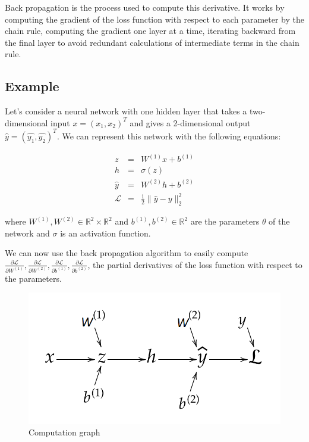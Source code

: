 \documentclass[10pt,a4paper]{article}
\theoremstyle{definition}
\theoremstyle{plain}
\begin{document}
Back propagation \cite{11} is the process used to compute this derivative. It works by computing the gradient of the loss function with respect to each parameter by the chain rule, computing the gradient one layer at a time, iterating backward from the final layer to avoid redundant calculations of intermediate terms in the chain rule.

\subsection{Example} \label{exnn}
Let's consider a neural network with one hidden layer that takes a two-dimensional input $x = (x_1, x_2)^T$ and gives a 2-dimensional output $\hat{y} = (\hat{y_1},\hat{y_2})^T$. We can represent this network with the following equations:

\begin{eqnarray*}
z & = & W^{(1)}x + b^{(1)} \\ 
h & = & \sigma (z)\\
\hat{y} & = &  W^{(2)}h + b^{(2)} \\
\mathcal{L} & = & \frac{1}{2} \| \hat{y} - y \|_2^2
\end{eqnarray*}
   
where $W^{(1)}, W^{(2)} \in \mathbb{R}^2\times \mathbb{R}^2$ and $b^{(1)}, b^{(2)} \in \mathbb{R}^2$ are the parameters $\theta$ of the network and $\sigma$ is an activation function.

We can now use the back propagation algorithm to easily compute $\frac{\partial \mathcal{L}}{\partial W^{(1)}}, \frac{\partial \mathcal{L}}{\partial W^{(2)}},\frac{\partial \mathcal{L}}{\partial b^{(1)}},\frac{\partial \mathcal{L}}{\partial b^{(2)}}$, the partial derivatives of the loss function with respect to the parameters.

\begin{figure}
\center
\includegraphics[scale=0.5]{computation_graph.png}
\caption{Computation graph}
\end{figure}
\end{document}

